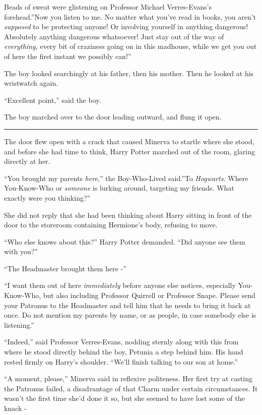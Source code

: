 Beads of sweat were glistening on Professor Michael Verres-Evans's
forehead.''Now you listen to me. No matter what you've read in books,
you aren't \emph{supposed} to be protecting anyone! Or involving
yourself in anything dangerous! Absolutely anything dangerous
whatsoever! Just stay out of the way of \emph{everything,} every bit of
craziness going on in this madhouse, while we get you out of here the
first instant we possibly can!''

The boy looked searchingly at his father, then his mother. Then he
looked at his wristwatch again.

``Excellent point,'' said the boy.

The boy marched over to the door leading outward, and flung it open.

\begin{center}\rule{3in}{0.4pt}\end{center}

The door flew open with a crack that caused Minerva to startle where she
stood, and before she had time to think, Harry Potter marched out of the
room, glaring directly at her.

``You brought my parents \emph{here},'' the Boy-Who-Lived said.''To
\emph{Hogwarts.} Where You-Know-Who or \emph{someone} is lurking around,
targeting my friends. What exactly were you thinking?''

She did not reply that she had been thinking about Harry sitting in
front of the door to the storeroom containing Hermione's body, refusing
to move.

``Who else knows about this?'' Harry Potter demanded. ``Did anyone see
them with you?''

``The Headmaster brought them here -''

``I want them out of here \emph{immediately} before anyone else notices,
especially You-Know-Who, but also including Professor Quirrell or
Professor Snape. Please send your Patronus to the Headmaster and tell
him that he needs to bring it back at once. Do not mention my parents by
name, or as people, in case somebody else is listening.''

``Indeed,'' said Professor Verres-Evans, nodding sternly along with this
from where he stood directly behind the boy, Petunia a step behind him.
His hand rested firmly on Harry's shoulder. ``We'll finish talking to
our son at home.''

``A moment, please,'' Minerva said in reflexive politeness. Her first
try at casting the Patronus failed, a disadvantage of that Charm under
certain circumstances. It wasn't the first time she'd done it so, but
she seemed to have lost some of the knack -

